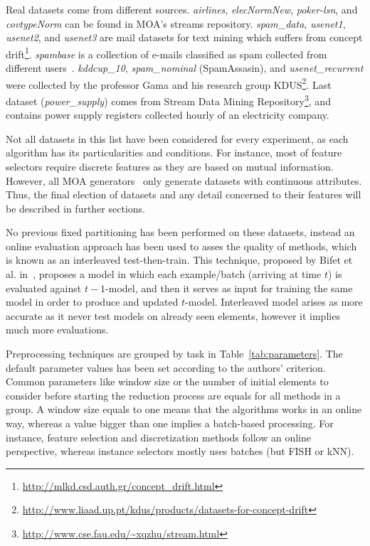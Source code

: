 \documentclass[preprint,12pt]{elsarticle}
\begin{document}
Real datasets come from different sources. \textit{airlines}, \textit{elecNormNew}, \textit{poker-lsn}, and \textit{covtypeNorm} can be found in MOA's streams repository. \textit{spam\_data}, \textit{usenet1}, \textit{usenet2}, and \textit{usenet3} are mail datasets for text mining which suffers from concept drift\footnote{\url{http://mlkd.csd.auth.gr/concept_drift.html}}. \textit{spambase} is a collection of e-mails classified as spam collected from different users~\cite{bache13}. \textit{kddcup\_10}, \textit{spam\_nominal} (SpamAssasin), and \textit{usenet\_recurrent} were collected by the professor Gama and his research group KDUS\footnote{\url{http://www.liaad.up.pt/kdus/products/datasets-for-concept-drift}}. Last dataset (\textit{power\_supply}) comes from Stream Data Mining Repository\footnote{\url{http://www.cse.fau.edu/~xqzhu/stream.html}}, and contains power supply registers collected hourly of an electricity company.

Not all datasets in this list have been considered for every experiment, as each algorithm has its particularities and conditions. For instance, most of feature selectors require discrete features as they are based on mutual information. However, all MOA generators~\cite{bifet10} only generate datasets with continuous attributes. Thus, the final election of datasets and any detail concerned to their features will be described in further sections.

No previous fixed partitioning has been performed on these datasets, instead an online evaluation approach has been used to asses the quality of methods, which is known as an interleaved test-then-train. This technique, proposed by Bifet et al. in~\cite{bifet09}, proposes a model in which each example/batch (arriving at time $t$) is evaluated against $t-1$-model, and then it serves as input for training the same model in order to produce and updated $t$-model. Interleaved model arises as more accurate as it never test models on already seen elements, however it implies much more evaluations.

Preprocessing techniques are grouped by task in Table~\ref{tab:parameters}. The default parameter values has been set according to the authors' criterion.
Common parameters like window size or the number of initial elements to consider before starting the reduction process are equals for all methods in a group. A window size equals to one means that the algorithms works in an online way, whereas a value bigger than one implies a batch-based processing. For instance, feature selection and discretization methods follow an online perspective, whereas instance selectors mostly uses batches (but FISH or kNN).
\end{document}

